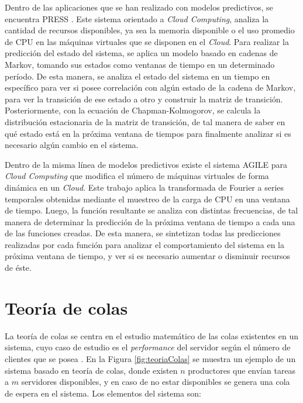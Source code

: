 Dentro de las aplicaciones que se han realizado con modelos predictivos, se encuentra PRESS \citep{GongGW10}. Este sistema orientado a \textit{Cloud Computing}, analiza la cantidad de recursos disponibles, ya sea la memoria disponible o el uso promedio de CPU en las m\'aquinas virtuales que se disponen en el \textit{Cloud}. Para realizar la predicci\'on del estado del sistema, se aplica un modelo basado en cadenas de Markov, tomando sus estados como ventanas de tiempo en un determinado per\'iodo. De esta manera, se analiza el estado del sistema en un tiempo en espec\'ifico para ver si posee correlaci\'on con alg\'un estado de la cadena de Markov, para ver la transici\'on de ese estado a otro y construir la matriz de transici\'on. Posteriormente, con la ecuaci\'on de Chapman-Kolmogorov, se calcula la distribuci\'on estacionaria de la matriz de transici\'on, de tal manera de saber en \normalsize{qu\'e} estado est\'a en la pr\'oxima ventana de tiempos para finalmente analizar si es necesario alg\'un cambio en el sistema.

Dentro de la misma l\'inea de modelos predictivos existe el sistema AGILE \citep{NguyenSGSW13} para \textit{Cloud Computing} que modifica el n\'umero de m\'aquinas virtuales de forma din\'amica en un \textit{Cloud}. Este trabajo aplica la transformada de Fourier \citep{falk2012first} a series temporales obtenidas mediante el muestreo de la carga de CPU en una ventana de tiempo. Luego, la funci\'on resultante se analiza con distintas frecuencias, de tal manera de determinar la predicci\'on de la pr\'oxima ventana de tiempo a cada una de las funciones creadas. De esta manera, se sintetizan \normalsize{todas las predicciones} realizadas por cada funci\'on para analizar el comportamiento del sistema en la pr\'oxima ventana de tiempo, y ver si es necesario aumentar o disminuir recursos de \'este.

\section{Teor\'ia de colas}
\label{sec:teoriaColas}

La teor\'ia de colas se centra en el estudio matem\'atico de las colas existentes en un sistema, cuyo caso de estudio \normalsize{es el \textit{performance} del servidor seg\'un el n\'umero de clientes que se posea} \citep{cooper1972introduction}. En la Figura \ref{fig:teoriaColas} se muestra un ejemplo de un sistema basado en teor\'ia de colas, donde existen $n$ productores que env\'ian tareas a $m$ servidores disponibles, y en caso de no estar disponibles se genera una cola de espera en el sistema. Los elementos del sistema son:

